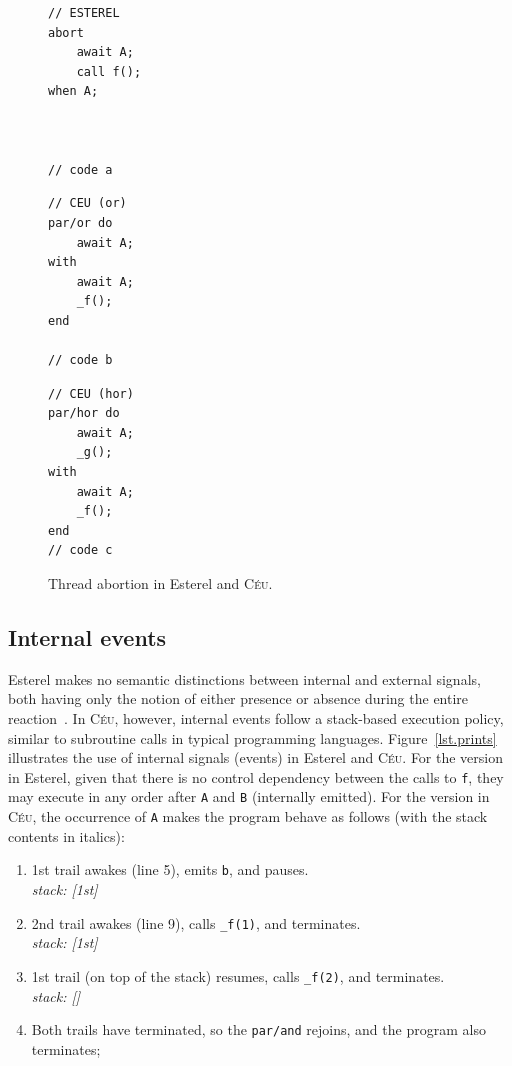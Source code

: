 \documentclass{acm_proc_article-sp}
\newcommand{\CEU}{\textsc{C\'{e}u}\xspace}
\newcommand{\code}[1] {{\small{\texttt{#1}}}}
\newcommand{\1}{\;}
\newcommand{\2}{\;\;}
\newcommand{\3}{\;\;\;}
\newcommand{\5}{\;\;\;\;\;}
\begin{document}
\begin{figure}[t]
\begin{minipage}[t]{0.32\linewidth}
\begin{lstlisting}
// ESTEREL
abort
    await A;
    call f();
when A;



// code a
\end{lstlisting}
\end{minipage}
%
\begin{minipage}[t]{0.32\linewidth}
\begin{lstlisting}
// CEU (or)
par/or do
    await A;
with
    await A;
    _f();
end

// code b
\end{lstlisting}
\end{minipage}
%
\begin{minipage}[t]{0.32\linewidth}
\begin{lstlisting}
// CEU (hor)
par/hor do
    await A;
    _g();
with
    await A;
    _f();
end
// code c
\end{lstlisting}
\end{minipage}
\caption{ Thread abortion in Esterel and \CEU. %
\label{lst.abortion}
}
\end{figure}

\subsection{Internal events}
\label{sec.ceu.ints}

Esterel makes no semantic distinctions between internal and external signals, 
both having only the notion of either presence or absence during the entire 
reaction~\cite{esterel.preemption}.
%
In \CEU, however, internal events follow a stack-based execution policy, 
similar to subroutine calls in typical programming languages.
%
Figure~\ref{lst.prints} illustrates the use of internal signals (events) in 
Esterel and \CEU.
%
For the version in Esterel, given that there is no control dependency between 
the calls to \code{f}, they may execute in any order after \code{A} and 
\code{B} (internally emitted).
%
For the version in \CEU, the occurrence of \code{A} makes the program behave as 
follows (with the stack contents in italics):
%
{\small
\begin{enumerate}
\setlength{\itemsep}{0pt}
\item 1st trail awakes (line 5), emits \code{b}, and pauses.\\
    \emph{stack: [1st]}
\item 2nd trail awakes (line 9), calls \code{\_f(1)}, and terminates.\\
    \emph{stack: [1st]}
\item 1st trail (on top of the stack) resumes, calls \code{\_f(2)}, and 
    terminates.\\
    \emph{stack: []}
\item Both trails have terminated, so the \code{par/and} rejoins, and the 
program also terminates;
\end{enumerate}
}
\end{document}
